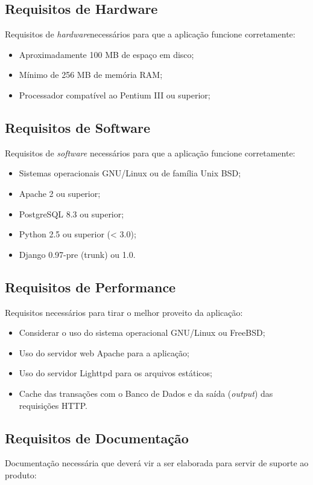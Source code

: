 \subsection{Requisitos de Hardware}
Requisitos de \textit{hardware}necessários para que a aplicação
funcione corretamente:

\begin{itemize}
\item Aproximadamente 100 MB de espaço em disco;
\item Mínimo de 256 MB de memória RAM;
\item Processador compatível ao Pentium III ou superior;
\end{itemize}

\subsection{Requisitos de Software}
Requisitos de \textit{software} necessários para que a aplicação
funcione corretamente:

\begin{itemize}
\item Sistemas operacionais GNU/Linux ou de família Unix BSD;
\item Apache 2 ou superior;
\item PostgreSQL 8.3 ou superior;
\item Python 2.5 ou superior (< 3.0);
\item Django 0.97-pre (trunk) ou 1.0.
\end{itemize}

\subsection{Requisitos de Performance}
Requisitos necessários para tirar o melhor proveito da aplicação:

\begin{itemize}
\item Considerar o uso do sistema operacional GNU/Linux ou FreeBSD;
\item Uso do servidor web Apache para a aplicação;
\item Uso do servidor Lighttpd para os arquivos estáticos;
\item Cache das transações com o Banco de Dados e da saída
  (\textit{output}) das requisições HTTP.
\end{itemize}

\subsection{Requisitos de Documentação}
Documentação necessária que deverá vir a ser elaborada para servir de
suporte ao produto:

